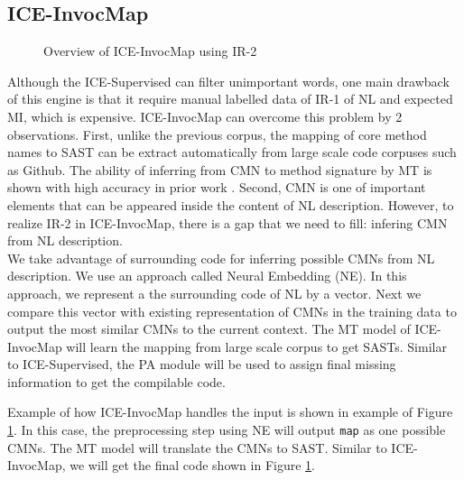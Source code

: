 \documentclass[sigconf,review]{acmart}
\begin{document}
\subsection{ICE-InvocMap}
\begin{figure}
        \caption{Overview of ICE-InvocMap using IR-2}
        \label{figIR2} 
\end{figure}

Although the ICE-Supervised can filter unimportant words, one main drawback of this engine is that it require manual labelled data of IR-1 of NL and expected MI, which is expensive. ICE-InvocMap can overcome this problem by 2 observations. First, unlike the previous corpus, the mapping of core method names to SAST can be extract automatically from large scale code corpuses such as Github. The ability of inferring from CMN to method signature by MT is shown with high accuracy in prior work \cite{022}. Second, CMN is one of important elements that can be appeared inside the content of NL description. However, to realize IR-2 in ICE-InvocMap, there is a gap that we need to fill: infering CMN from NL description.
\\
We take advantage of surrounding code for inferring possible CMNs from NL description. We use an approach called Neural Embedding (NE). In this approach, we represent a the surrounding code of NL by a vector. Next we compare this vector with existing representation of CMNs in the training data to output the most similar CMNs to the current context. The MT model of ICE-InvocMap will learn the mapping from large scale corpus to get SASTs. Similar to ICE-Supervised, the PA module will be used to assign final missing information to get the compilable code.

Example of how ICE-InvocMap handles the input is shown in example of Figure \ref{figIR2}. In this case, the preprocessing step using NE will output \texttt{map} as one possible CMNs. The MT model will translate the CMNs to SAST. Similar to ICE-InvocMap, we will get the final code shown in Figure \ref{figIR2}.
\end{document}
